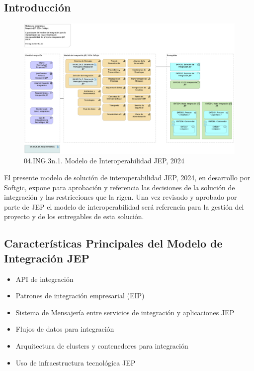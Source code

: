 \documentclass[
  paper=a4,
  ,captions=tableheading
]{scrartcl}
\providecommand{\tightlist}{%
  \setlength{\itemsep}{0pt}\setlength{\parskip}{0pt}}
\begin{document}
\subsection{Introducción}\label{sec:introducciuxf3n-1}

\begin{figure}
\centering
\includegraphics{01.1n.modelointegrac.png}
\caption{04.ING.3n.1. Modelo de Interoperabilidad JEP, 2024}
\end{figure}

El presente modelo de solución de interoperabilidad JEP, 2024, en
desarrollo por Softgic, expone para aprobación y referencia las
decisiones de la solución de integración y las restricciones que la
rigen. Una vez revisado y aprobado por parte de JEP el modelo de
interoperabilidad será referencia para la gestión del proyecto y de los
entregables de esta solución.

\subsection{Características Principales del Modelo de Integración
JEP}\label{sec:caracteruxedsticas-principales-del-modelo-de-integraciuxf3n-jep-1}

\begin{itemize}
\tightlist
\item
  API de integración
\item
  Patrones de integración empresarial (EIP)
\item
  Sistema de Mensajería entre servicios de integración y aplicaciones
  JEP
\item
  Flujos de datos para integración
\item
  Arquitectura de clusters y contenedores para integración
\item
  Uso de infraestructura tecnológica JEP
\end{itemize}
\end{document}

